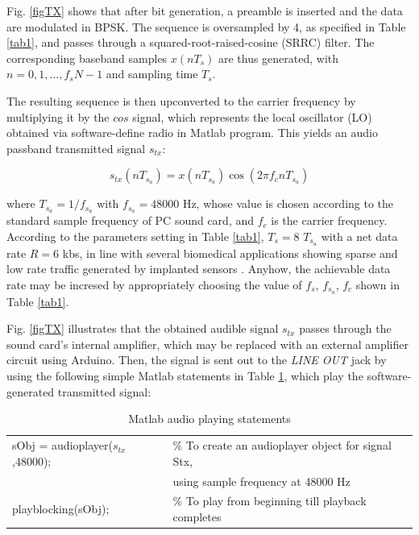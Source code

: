 Fig. \ref{figTX} shows that after bit generation, a preamble is inserted and the data are modulated in BPSK. The sequence is oversampled by 4, as specified in Table \ref{tab1}, and passes through a squared-root-raised-cosine (SRRC) filter. %
The corresponding baseband samples $x(nT_s)$ are thus generated, with  $n=0,1,...,f_sN-1$ and sampling time $T_s$.

The resulting sequence is then upconverted to the carrier frequency by multiplying it by the $cos$ signal, which represents the local oscillator (LO) obtained via software-define radio in Matlab program. This yields an audio passband transmitted signal  $s_{tx}$:

\begin{equation}
s_{tx}(nT_{s_a})= x(n T_{s_a}) \cos (2 \pi f_c n T_{s_a}) 
\end{equation} 

where %
$T_{s_a}=1/f_{s_a}$ with $f_{s_a}=48000$ Hz, whose value is chosen according to the standard sample frequency of PC sound card, and $f_c$ is the carrier frequency. According to the parameters setting in Table \ref{tab1}, $T_{s}=8$ $T_{s_a}$ with a net data rate $R=6$ kbs, in line with several biomedical applications showing sparse and low rate traffic generated by implanted sensors \cite{Swaminathan2017,Tomlinson2018}.
Anyhow, the achievable data rate may be incresed by appropriately choosing the value of $f_s$, $f_{s_a}$, $f_c$ shown in Table \ref{tab1}. 

Fig. \ref{figTX} illustrates that the obtained audible signal $s_{tx}$ passes through the sound card's internal amplifier, which may be replaced with an external amplifier circuit using Arduino. Then, the signal is sent out to the \emph{LINE OUT} jack by using the following simple Matlab statements in Table \ref{tab2}, which play the software-generated transmitted signal:

\begin{table}
	\caption{Matlab audio playing statements}\label{tab2}
	\begin{tabular}{|l l|}
		\hline
		sObj = audioplayer($s_{tx}$,48000);&   $\%$ To create an audioplayer object for signal Stx,\\ 
		& \phantom{xx}  using sample frequency at 48000 Hz\\  
		playblocking(sObj);	& $\%$ To play from beginning till playback completes\\
		\hline
	\end{tabular}
\end{table}

